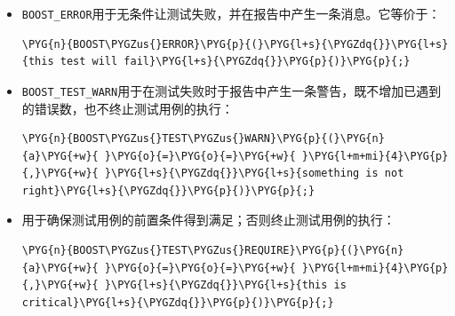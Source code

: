 \begin{itemize}

\item \texttt{BOOST\_\allowbreak{}ERROR}用于无条件让测试失败，并在报告中产生一条消息。它等价于：



\begin{codeblockbg}
\begin{Verbatim}[commandchars=\\\{\},breaklines=true,breakanywhere=true,fontsize=\codefont,xleftmargin=17bp]
\PYG{n}{BOOST\PYGZus{}ERROR}\PYG{p}{(}\PYG{l+s}{\PYGZdq{}}\PYG{l+s}{this test will fail}\PYG{l+s}{\PYGZdq{}}\PYG{p}{)}\PYG{p}{;}
\end{Verbatim}
\end{codeblockbg}



\item \texttt{BOOST\_\allowbreak{}TEST\_\allowbreak{}WARN}用于在测试失败时于报告中产生一条警告，既不增加已遇到的错误数，也不终止测试用例的执行：



\begin{codeblockbg}
\begin{Verbatim}[commandchars=\\\{\},breaklines=true,breakanywhere=true,fontsize=\codefont,xleftmargin=17bp]
\PYG{n}{BOOST\PYGZus{}TEST\PYGZus{}WARN}\PYG{p}{(}\PYG{n}{a}\PYG{+w}{ }\PYG{o}{=}\PYG{o}{=}\PYG{+w}{ }\PYG{l+m+mi}{4}\PYG{p}{,}\PYG{+w}{ }\PYG{l+s}{\PYGZdq{}}\PYG{l+s}{something is not right}\PYG{l+s}{\PYGZdq{}}\PYG{p}{)}\PYG{p}{;}
\end{Verbatim}
\end{codeblockbg}



\item {}用于确保测试用例的前置条件得到满足；否则终止测试用例的执行：



\begin{codeblockbg}
\begin{Verbatim}[commandchars=\\\{\},breaklines=true,breakanywhere=true,fontsize=\codefont,xleftmargin=17bp]
\PYG{n}{BOOST\PYGZus{}TEST\PYGZus{}REQUIRE}\PYG{p}{(}\PYG{n}{a}\PYG{+w}{ }\PYG{o}{=}\PYG{o}{=}\PYG{+w}{ }\PYG{l+m+mi}{4}\PYG{p}{,}\PYG{+w}{ }\PYG{l+s}{\PYGZdq{}}\PYG{l+s}{this is critical}\PYG{l+s}{\PYGZdq{}}\PYG{p}{)}\PYG{p}{;}
\end{Verbatim}
\end{codeblockbg}



\end{itemize}
